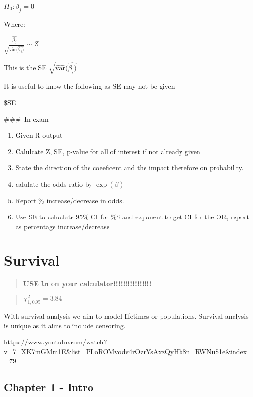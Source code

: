 \documentclass[
  letterpaper,
  DIV=11,
  numbers=noendperiod]{scrreprt}
\providecommand{\tightlist}{%
  \setlength{\itemsep}{0pt}\setlength{\parskip}{0pt}}\usepackage{longtable,booktabs,array}
\begin{document}
\(H_0 : \beta_j = 0\)

Where:

\(\frac{\hat{\beta_j}}{  \sqrt{  \hat{\text{var}}(\hat{\beta_j)}  } } \sim Z\)

This is the SE \(\sqrt{\hat{\text{var}}(\hat{\beta_j)}}\)

It is useful to know the following as SE may not be given

\$SE = 

\#\#\#~In exam

\begin{enumerate}
\def\labelenumi{\arabic{enumi})}
\tightlist
\item
  Given R output
\item
  Calulcate Z, SE, p-value for all of interest if not already given
\item
  State the direction of the coeeficent and the impact therefore on
  probability.
\item
  calulate the odds ratio by \(\exp(\beta)\)
\item
  Report \% increase/decrease in odds.
\item
  Use SE to caluclate 95\% CI for \%\beta\$ and exponent to get CI for
  the OR, report as percentage increase/decrease
\end{enumerate}


\hypertarget{survival}{%
\chapter{Survival}\label{survival}}

\begin{quote}
\textbf{USE \texttt{ln} on your calculator!!!!!!!!!!!!!!!!}
\end{quote}

\begin{quote}
\(\chi^2_{1, 0.95} = 3.84\)
\end{quote}

With survival analysis we aim to model lifetimes or populations.
Survival analysis is unique as it aims to include censoring.

https://www.youtube.com/watch?v=7\_XK7mGMm1E\&list=PLoROMvodv4rOzrYsAxzQyHb8n\_RWNuS1e\&index=79

\hypertarget{chapter-1---intro-1}{%
\section{Chapter 1 - Intro}\label{chapter-1---intro-1}}
\end{document}
